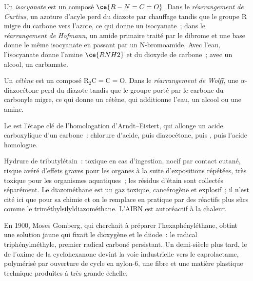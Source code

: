\begin{definition}\label{def:b3:radicals-carbenes:curtius}
Un \emph{isocyanate} est un composé $\ce{R-N=C=O}$. Dans le \emph{réarrangement de Curtius}, un azoture d'acyle perd du diazote par
chauffage tandis que le groupe R migre du carbone vers l'azote, ce qui donne
un isocyanate~; dans le \emph{réarrangement de Hofmann}, un amide
primaire traité par le dibrome et une base donne le même isocyanate en
passant par un N-bromoamide. Avec l'eau, l'isocyanate donne l'amine $\ce{RNH2}$ et du dioxyde
de carbone~; avec un alcool, un carbamate.
\end{definition}

\begin{definition}\label{def:b3:radicals-carbenes:wolff}
Un \emph{cétène} est un composé $\mathrm{R_2C{=}C{=}O}$. Dans le \emph{réarrangement de Wolff}, une $\alpha$-diazocétone perd du diazote
tandis que le groupe porté par le carbone du carbonyle migre, ce qui donne
un cétène, qui additionne l'eau, un alcool ou une amine.
\end{definition}

Le  est l'étape clé de l'homologation
d'Arndt--Eistert, qui allonge un acide carboxylique d'un carbone~: chlorure
d'acide, puis diazocétone, puis , puis l'acide homologue.

\begin{safety}{}
Hydrure de tributylétain~: toxique en cas d'ingestion, nocif par contact
cutané, risque avéré d'effets graves pour les organes à la suite
d'expositions répétées, très toxique pour les organismes aquatiques~; les
résidus d'étain sont collectés séparément. Le diazométhane est un gaz
toxique, cancérogène et explosif~; il n'est cité ici que pour sa chimie et
on le remplace en pratique par des réactifs plus sûrs comme le
triméthylsilyldiazométhane. L'AIBN est autoréactif à la chaleur.
\end{safety}

\begin{history}
En 1900, Moses Gomberg, qui cherchait à préparer l'hexaphényléthane,
obtint une solution jaune qui fixait le dioxygène et le diiode~: le radical
triphénylméthyle, premier radical carboné persistant. Un demi-siècle plus
tard, le  de l'oxime de la cyclohexanone devint la
voie industrielle vers le caprolactame, polymérisé par ouverture de cycle en
nylon-6, une fibre et une matière plastique technique produites à très
grande échelle.
\end{history}

